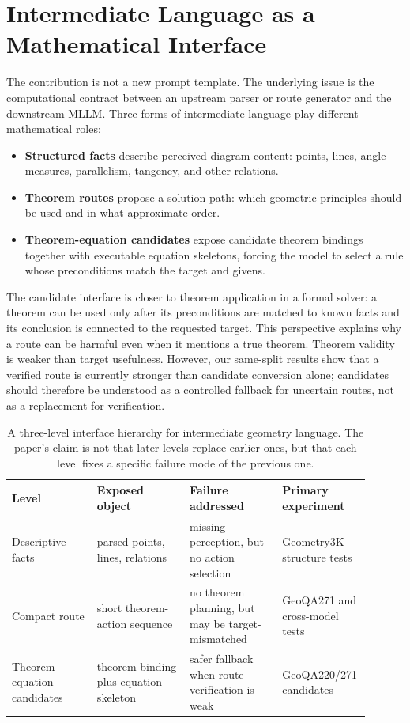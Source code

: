 \documentclass[11pt]{article}
\begin{document}
\section{Intermediate Language as a Mathematical Interface}
The contribution is not a new prompt template. The underlying issue is the computational contract between an upstream parser or route generator and the downstream MLLM. Three forms of intermediate language play different mathematical roles:

\begin{itemize}[leftmargin=*]
\item \textbf{Structured facts} describe perceived diagram content: points, lines, angle measures, parallelism, tangency, and other relations.
\item \textbf{Theorem routes} propose a solution path: which geometric principles should be used and in what approximate order.
\item \textbf{Theorem-equation candidates} expose candidate theorem bindings together with executable equation skeletons, forcing the model to select a rule whose preconditions match the target and givens.
\end{itemize}

The candidate interface is closer to theorem application in a formal solver: a theorem can be used only after its preconditions are matched to known facts and its conclusion is connected to the requested target. This perspective explains why a route can be harmful even when it mentions a true theorem. Theorem validity is weaker than target usefulness. However, our same-split results show that a verified route is currently stronger than candidate conversion alone; candidates should therefore be understood as a controlled fallback for uncertain routes, not as a replacement for verification.

\begin{table}[t]
\centering
\caption{A three-level interface hierarchy for intermediate geometry language. The paper's claim is not that later levels replace earlier ones, but that each level fixes a specific failure mode of the previous one.}
\label{tab:interface-hierarchy}
\small
\begin{tabular}{p{0.23\linewidth}p{0.25\linewidth}p{0.25\linewidth}p{0.17\linewidth}}
\toprule
Level & Exposed object & Failure addressed & Primary experiment \\
\midrule
Descriptive facts & parsed points, lines, relations & missing perception, but no action selection & Geometry3K structure tests \\
Compact route & short theorem-action sequence & no theorem planning, but may be target-mismatched & GeoQA271 and cross-model tests \\
Theorem-equation candidates & theorem binding plus equation skeleton & safer fallback when route verification is weak & GeoQA220/271 candidates \\
\bottomrule
\end{tabular}
\end{table}
\end{document}
